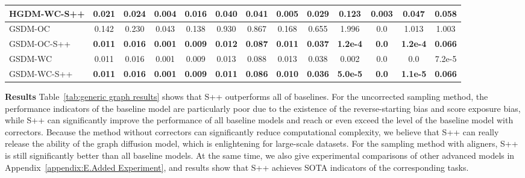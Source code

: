 \documentclass{article}
\begin{document}
\begin{table}[!t]
{\begin{tabular}{lcccccccccccc}
HGDM-WC-S++ & \textbf{0.021} & \textbf{0.024} & \textbf{0.004} & \textbf{0.016} & \textbf{0.040} & \textbf{0.041} & \textbf{0.005} & \textbf{0.029} & \textbf{0.123} & \textbf{0.003} & \textbf{0.047} & \textbf{0.058} \\
\midrule
GSDM-OC & 0.142 & 0.230 & 0.043 & 0.138 & 0.930 & 0.867 & 0.168 & 0.655 & 1.996 & 0.0 & 1.013 & 1.003 \\
GSDM-OC-S++ & \textbf{0.011} & \textbf{0.016} & \textbf{0.001} & \textbf{0.009} & \textbf{0.012} & \textbf{0.087} & \textbf{0.011} & \textbf{0.037} & \textbf{1.2e-4} & \textbf{0.0} & \textbf{1.2e-4} & \textbf{0.066} \\
GSDM-WC & 0.011 & 0.016 & 0.001 & 0.009 & 0.013 & 0.088 & 0.013 & 0.038 & 0.002 & 0.0 & 0.0 & 7.2e-5 \\
GSDM-WC-S++ & \textbf{0.011} & \textbf{0.016} & \textbf{0.001} & \textbf{0.009} & \textbf{0.011} & \textbf{0.086} & \textbf{0.010} & \textbf{0.036} & \textbf{5.0e-5} & \textbf{0.0} & \textbf{1.1e-5} & \textbf{0.066} \\
\bottomrule
\end{tabular}%
}
\end{table}

\textbf{Results} Table~\ref{tab:generic graph results} shows that S++ outperforms all of baselines. For the uncorrected sampling method, the performance indicators of the baseline model are particularly poor due to the existence of the reverse-starting bias and score exposure bias, while S++ can significantly improve the performance of all baseline models and reach or even exceed the level of the baseline model with correctors. Because the method without correctors can significantly reduce computational complexity, we believe that S++ can really release the ability of the graph diffusion model, which is enlightening for large-scale datasets. For the sampling method with aligners, S++ is still significantly better than all baseline models. At the same time, we also give experimental comparisons of other advanced models in Appendix~\ref{appendix:E.Added Experiment}, and results show that S++ achieves SOTA indicators of the corresponding tasks.
\end{document}
